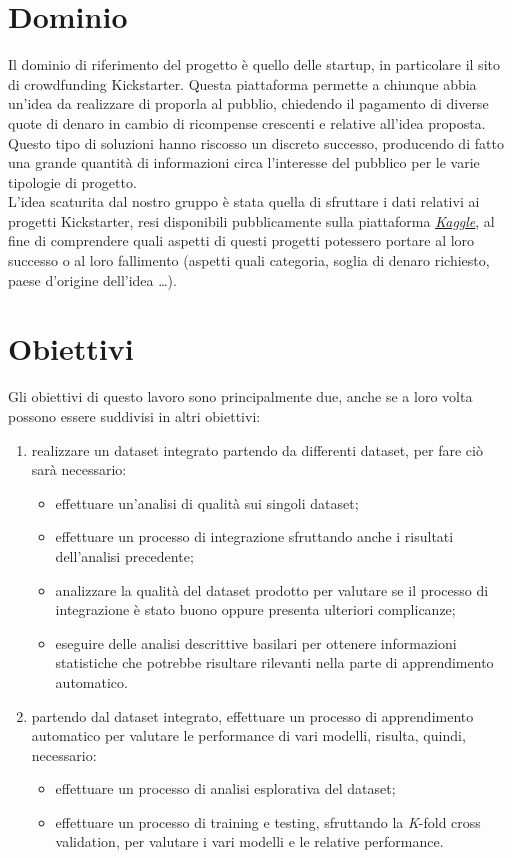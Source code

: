 \section{Dominio}
Il dominio di riferimento del progetto è quello delle startup, in particolare il sito di crowdfunding Kickstarter. Questa piattaforma permette a chiunque abbia un'idea da realizzare di proporla al pubblio, chiedendo il pagamento di diverse quote di denaro in cambio di ricompense crescenti e relative all'idea proposta.\\
Questo tipo di soluzioni hanno riscosso un discreto successo, producendo di fatto una grande quantità di informazioni circa l'interesse del pubblico per le varie tipologie di progetto.\\
L'idea scaturita dal nostro gruppo è stata quella di sfruttare i dati relativi ai progetti Kickstarter, resi disponibili pubblicamente sulla piattaforma \href{https://www.kaggle.com/}{\emph{Kaggle}}, al fine di comprendere quali aspetti di questi progetti potessero portare al loro successo o al loro fallimento (aspetti quali categoria, soglia di denaro richiesto, paese d'origine dell'idea \dots).

\section{Obiettivi}
Gli obiettivi di questo lavoro sono principalmente due, anche se a loro volta possono essere suddivisi in altri obiettivi: \begin{enumerate}
	\item realizzare un dataset integrato partendo da differenti dataset, per fare ciò sarà necessario: \begin{itemize}
		\item effettuare un'analisi di qualità sui singoli dataset;
		\item effettuare un processo di integrazione sfruttando anche i risultati dell'analisi precedente;
		\item analizzare la qualità del dataset prodotto per valutare se il processo di integrazione è stato buono oppure presenta ulteriori complicanze;
		\item eseguire delle analisi descrittive basilari per ottenere informazioni statistiche che potrebbe risultare rilevanti nella parte di apprendimento automatico.
	\end{itemize}
	\item partendo dal dataset integrato, effettuare un processo di apprendimento automatico per valutare le performance di vari modelli, risulta, quindi, necessario: \begin{itemize}
		\item effettuare un processo di analisi esplorativa del dataset;
		\item effettuare un processo di training e testing, sfruttando la \textit{K}-fold cross validation, per valutare i vari modelli e le relative performance.
	\end{itemize}
\end{enumerate}

